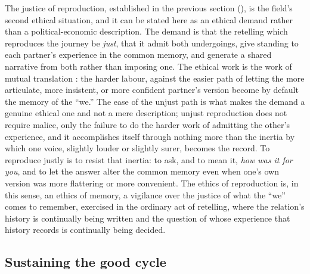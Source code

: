 The justice of reproduction, established in the previous section (), is the field's second ethical situation, and it can be stated here as an ethical demand rather than a political-economic description. The demand is that the retelling which reproduces the journey be \emph{just}, that it admit both undergoings, give standing to each partner's experience in the common memory, and generate a shared narrative from both rather than imposing one. The ethical work is the work of mutual translation \parencite{paperxiii}: the harder labour, against the easier path of letting the more articulate, more insistent, or more confident partner's version become by default the memory of the ``we.'' The ease of the unjust path is what makes the demand a genuine ethical one and not a mere description; unjust reproduction does not require malice, only the failure to do the harder work of admitting the other's experience, and it accomplishes itself through nothing more than the inertia by which one voice, slightly louder or slightly surer, becomes the record. To reproduce justly is to resist that inertia: to ask, and to mean it, \emph{how was it for you}, and to let the answer alter the common memory even when one's own version was more flattering or more convenient. The ethics of reproduction is, in this sense, an ethics of memory, a vigilance over the justice of what the ``we'' comes to remember, exercised in the ordinary act of retelling, where the relation's history is continually being written and the question of whose experience that history records is continually being decided.

\subsection{Sustaining the good cycle}
\label{p21:sub:ethics-sustaining}

